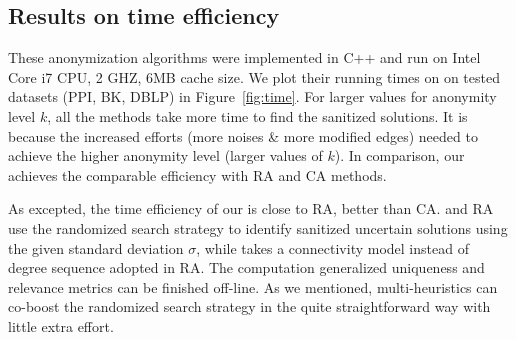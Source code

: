 \vspace{-6pt}
\subsection{Results on time efficiency}
These anonymization algorithms were implemented in C++ and run on Intel Core i7 CPU, 2 GHZ, 6MB cache size. We plot their running times on on tested datasets (PPI, BK, DBLP) in Figure~\ref{fig:time}. For larger values for anonymity level $k$, all the methods take more time to find the sanitized solutions. It is because the increased efforts (more noises \& more modified edges) needed to achieve the higher anonymity level (larger values of $k$). 
In comparison, our {\methodName} achieves the comparable efficiency with RA and CA methods.  

As excepted, the time efficiency of our {\methodName} is close to RA, better than CA.
{\methodName} and RA use the randomized search strategy to identify sanitized uncertain solutions using the given standard deviation $\sigma$, while {\methodName} takes a connectivity model instead of degree sequence adopted in RA. 
The computation generalized uniqueness and relevance metrics can be finished off-line.
As we mentioned, multi-heuristics can co-boost the randomized search strategy in the quite straightforward way with little extra effort. 

